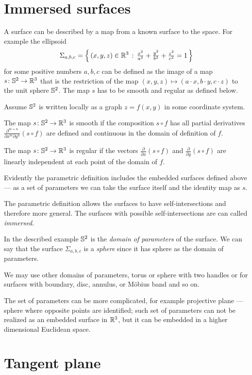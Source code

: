 \section{Immersed surfaces}

A surface can be described by a map from a known surface to the space.
For example the ellipsoid
\[\Sigma_{a,b,c}=\left\{\,{(x,y,z)\in\mathbb{R}^3}\,:\,{\tfrac{x^2}{a^2}+\tfrac{y^2}{b^2}+\tfrac{z^2}{c^2}=1}\,\right\}\]
for some positive numbers $a,b,c$ can be defined as the image of a map $s\colon\mathbb{S}^2\to\mathbb{R}^3$ that is the restriction of the map $(x,y,z)\mapsto (a\cdot x, b\cdot y,c\cdot z)$ to the unit sphere $\mathbb{S}^2$.
The map $s$ has to be smooth and regular as defined below. 

Assume $\mathbb{S}^2$ is written locally as a graph $z=f(x,y)$ in some coordinate system.

The map $s\colon\mathbb{S}^2\to \mathbb{R}^3$ is  smooth if the composition $s\circ f$ has all partial derivatives $\frac{\partial^{m+n}}{\partial x^m\partial y^n}(s\circ f)$ are defined and continuous in the domain of definition of $f$.

The map $s\colon\mathbb{S}^2\to \mathbb{R}^3$ is regular
if the vectors $\frac{\partial}{\partial x}(s\circ f)$ and $\frac{\partial}{\partial y}(s\circ f)$ are linearly independent at each point of the domain of $f$.

Evidently the parametric definition includes the embedded surfaces defined above --- as a set of parameters we can take the surface itself and the identity map as $s$.

 The parametric definition allows the surfaces to have self-intersections and therefore more general.
The surfaces with possible self-intersections are  can called \emph{immersed}.

In the described example $\mathbb{S}^2$ is the \emph{domain of parameters} of the surface.
We can say that the surface $\Sigma_{a,b,c}$ is a \emph{sphere} since it has sphere as the domain of parameters.

We may use other domains of parameters, torus or sphere with two handles or for surfaces with boundary, disc, annulus, or M\"obius band and so on.

The set of parameters can be more complicated, for example projective plane --- sphere where opposite points are identified; such set of parameters can not be realized as an embedded surface in $\mathbb{R}^3$, but it can be embedded in a higher dimensional Euclidean space.

\section{Tangent plane}

